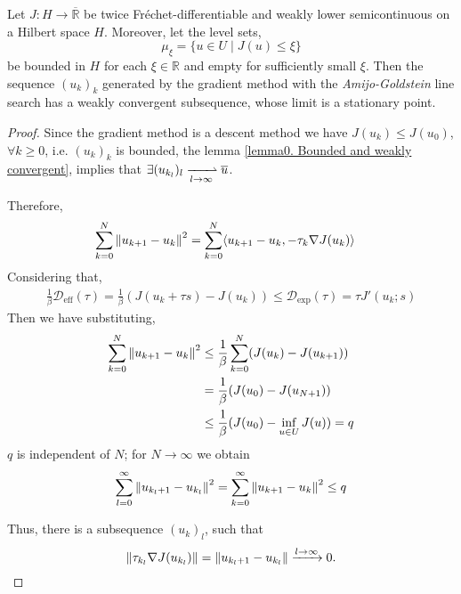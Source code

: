 \begin{theorem}
	Let $J:H\rightarrow \overline{\mathbb{R}}$ be twice Fr\'echet-differentiable and weakly lower semicontinuous on a Hilbert space $H$. Moreover, let the level sets,
	\[
		\mu_\xi = \{ u \in U \mid J(u)\leq \xi \}
	\]
	be bounded in $H$ for each $\xi \in \mathbb{R}$ and empty for sufficiently small $\xi$. Then the sequence $(u_k)_k$ generated by the gradient method with the \textit{Amijo-Goldstein} line search has a weakly convergent subsequence, whose limit is a stationary point. 
	
	\begin{proof}
		Since the gradient method is a descent method we have $J(u_k) \leq J(u_0)$, $\forall k \geq 0$,
		i.e. $(u_k)_k$ is bounded, the lemma \eqref{lemma0. Bounded and weakly convergent}, implies that $\exists (u_{k_l})_l \xrightharpoonup[l\rightarrow\infty]{} \overline{u}$.
		
		Therefore,
		\begin{align*}
			\sum_{k=0}^N \left\lVert u_{k+1}-u_k\right\rVert^2 &= \sum_{k=0}^N \langle u_{k+1}-u_{k}, -\tau_k \nabla J(u_k)\rangle
		\end{align*}
		Considering that,
		\begin{align*}
			\frac{1}{\beta} \mathcal{D}_{\text{eff}}(\tau)=\frac{1}{\beta}\left(J(u_k+\tau s)-J(u_k)\right) \leq \mathcal{D}_{\text{exp}}(\tau)=\tau J'(u_k;s)
		\end{align*}
		Then we have substituting, 
		\begin{align*}
						\sum_{k=0}^N \left\lVert u_{k+1}-u_k\right\rVert^2&\leq \frac{1}{\beta} \sum_{k=0}^{N} (J(u_k)-J(u_{k+1})) \\&= \frac{1}{\beta} (J(u_0)-J(u_{N+1})) \\
			&\leq \frac{1}{\beta} (J(u_0)-\inf_{u\in U} J(u)) = q
		\end{align*}
	$q$ is independent of $N$; for $N\rightarrow \infty$ we obtain 
	\[
	\sum_{l=0}^{\infty} \left\lVert u_{{k_l}+1}-u_{k_l}\right\rVert^2=\sum_{k=0}^{\infty} \left\lVert u_{k+1}-u_{k}\right\rVert^2\leq q
	\]
	
	Thus, there is a subsequence $(u_k)_l$, such that
	\[
	\left\lVert\tau_{k_l}\nabla J(u_{k_l})\right\rVert=\left\lVert u_{{k_l}+1}-u_{k_l}\right\rVert \xrightarrow{l\rightarrow \infty} 0.
	\]
	

\end{proof}
\end{theorem}
